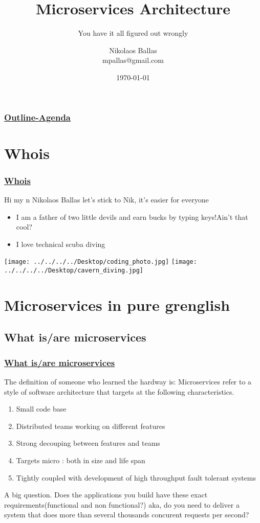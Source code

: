 \documentclass{beamer}
\title{Microservices Architecture}
\subtitle{You have it all figured out wrongly}
\author{Nikolaos Ballas\\ mpallas@gmail.com}
\date{\today}
\begin{document}
\begin{frame}
	\titlepage
\end{frame}
\begin{frame}
	\frametitle{\underline{Outline-Agenda}}
	\tableofcontents
\end{frame}

\section{Whois}
\begin{frame}
	\frametitle{\underline{Whois}}
	Hi my n
	{Nikolaos Ballas} let's stick to Nik, it's easier for everyone
	\begin{itemize}
		\item I am a father of two little devils and earn bucks by typing keys!Ain't that cool?
		\item I love technical scuba diving
	\end{itemize}
	\texttt{[image: ../../../../Desktop/coding\_photo.jpg]}
	\texttt{[image: ../../../../Desktop/cavern\_diving.jpg]} 
\end{frame}

\section{Microservices in pure grenglish}
	\subsection{What is/are microservices}
\begin{frame}
	\frametitle{\underline{What is/are microservices}}
	The definition of someone who learned the hardway is:
	Microservices refer to a style of software architecture that targets at the following characteristics.
	\begin{enumerate}
		\item Small code base
		\item Distributed teams working on different features
		\item Strong decouping between features and teams
		\item Targets micro : both in size and life span
		\item Tightly coupled with development of high throughput fault tolerant systems
	\end{enumerate}
	A big question. Does the applications you build have these exact requirements(functional and non functional?)
	aka, do you need to deliver a system that does more than several thousands concurent requests per second?
\end{frame}
\end{document}
